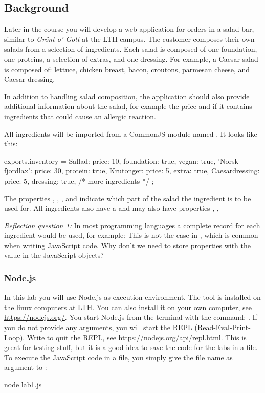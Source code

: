 \documentclass[fleqn, article, a4paper]{memoir}
\begin{document}
\subsection*{Background}

Later in the course you will develop a web application for orders in a salad bar, similar to \emph{Grönt o' Gott} at the LTH campus. The customer composes their own salads from a selection of ingredients. Each salad is composed of one foundation, one proteins, a selection of extras, and one dressing. For example, a Caesar salad is composed of: lettuce, chicken breast, bacon, croutons, parmesan cheese, and Caesar dressing.

In addition to handling salad composition, the application should also provide additional information about the salad, for example the price and if it contains ingredients that could cause an allergic reaction.

\noindent All ingredients will be imported from a CommonJS module named . It looks like this:
\begin{Code}
exports.inventory = {
  Sallad: {price: 10, foundation: true, vegan: true}, 
  'Norsk fjordlax': {price: 30, protein: true},
  Krutonger: {price: 5, extra: true},
  Caesardressing: {price: 5, dressing: true},
  /* more ingredients */
};
\end{Code}
\noindent The properties , , , and  indicate which part of the salad the ingredient is to be used for. All ingredients also have a  and may also have properties , , 

\noindent \emph{Reflection question 1:} In most programming languages a complete record for each ingredient would be used, for example: 
This is not the case in , which is common when writing JavaScript code. Why don't we need to store properties with the value  in the JavaScript objects?


\subsubsection*{Node.js}

In this lab you will use Node.js as execution environment. The tool is installed on the linux computers at LTH. You can also install it on your own computer, see \url{https://nodejs.org/}. You start Node.js from the terminal with the command: . If you do not provide any arguments, you will start the REPL (Read-Eval-Print-Loop). Write  to quit the REPL, see \url{https://nodejs.org/api/repl.html}. This is great for testing stuff, but it is a good idea to save the code for the labs in a file. To execute the JavaScript code in a file, you simply give the file name as argument to :
\begin{Code}
  node lab1.js
\end{Code}
 
\end{document}
